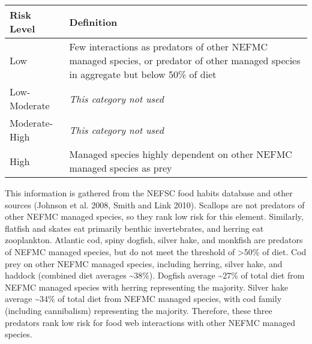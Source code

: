 \documentclass[11pt,]{article}
\begin{document}
\begin{longtable}[]{@{}ll@{}}
\toprule
\begin{minipage}[b]{0.22\columnwidth}\raggedright\strut
Risk Level\strut
\end{minipage} & \begin{minipage}[b]{0.72\columnwidth}\raggedright\strut
Definition\strut
\end{minipage}\tabularnewline
\midrule
\endhead
\begin{minipage}[t]{0.22\columnwidth}\raggedright\strut
Low\strut
\end{minipage} & \begin{minipage}[t]{0.72\columnwidth}\raggedright\strut
Few interactions as predators of other NEFMC managed species, or
predator of other managed species in aggregate but below 50\% of
diet\strut
\end{minipage}\tabularnewline
\begin{minipage}[t]{0.22\columnwidth}\raggedright\strut
Low-Moderate\strut
\end{minipage} & \begin{minipage}[t]{0.72\columnwidth}\raggedright\strut
\emph{This category not used}\strut
\end{minipage}\tabularnewline
\begin{minipage}[t]{0.22\columnwidth}\raggedright\strut
Moderate-High\strut
\end{minipage} & \begin{minipage}[t]{0.72\columnwidth}\raggedright\strut
\emph{This category not used}\strut
\end{minipage}\tabularnewline
\begin{minipage}[t]{0.22\columnwidth}\raggedright\strut
High\strut
\end{minipage} & \begin{minipage}[t]{0.72\columnwidth}\raggedright\strut
Managed species highly dependent on other NEFMC managed species as
prey\strut
\end{minipage}\tabularnewline
\bottomrule
\end{longtable}

This information is gathered from the NEFSC food habits database and
other sources (Johnson et al. 2008, Smith and Link 2010). Scallops are
not predators of other NEFMC managed species, so they rank low risk for
this element. Similarly, flatfish and skates eat primarily benthic
invertebrates, and herring eat zooplankton. Atlantic cod, spiny dogfish,
silver hake, and monkfish are predators of NEFMC managed species, but do
not meet the threshold of \textgreater{}50\% of diet. Cod prey on other
NEFMC managed species, including herring, silver hake, and haddock
(combined diet averages \textasciitilde{}38\%). Dogfish average
\textasciitilde{}27\% of total diet from NEFMC managed species with
herring representing the majority. Silver hake average
\textasciitilde{}34\% of total diet from NEFMC managed species, with cod
family (including cannibalism) representing the majority. Therefore,
these three predators rank low risk for food web interactions with other
NEFMC managed species.
\end{document}
